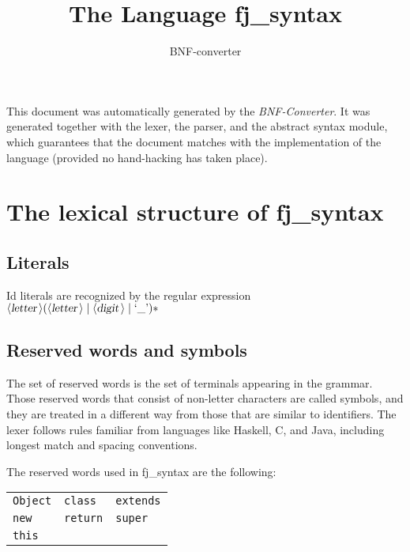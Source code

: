 \documentclass[a4paper,11pt]{article}
\author{BNF-converter}
\title{The Language fj_syntax}
\begin{document}
\maketitle

\newcommand{\emptyP}{\mbox{$\epsilon$}}
\newcommand{\terminal}[1]{\mbox{{\texttt {#1}}}}
\newcommand{\nonterminal}[1]{\mbox{$\langle \mbox{{\sl #1 }} \! \rangle$}}
\newcommand{\arrow}{\mbox{::=}}
\newcommand{\delimit}{\mbox{$|$}}
\newcommand{\reserved}[1]{\mbox{{\texttt {#1}}}}
\newcommand{\literal}[1]{\mbox{{\texttt {#1}}}}
\newcommand{\symb}[1]{\mbox{{\texttt {#1}}}}

This document was automatically generated by the {\em BNF-Converter}. It was generated together with the lexer, the parser, and the abstract syntax module, which guarantees that the document matches with the implementation of the language (provided no hand-hacking has taken place).

\section*{The lexical structure of fj_syntax}

\subsection*{Literals}


Id literals are recognized by the regular expression
\({\nonterminal{letter}} ({\nonterminal{letter}} \mid {\nonterminal{digit}} \mid \mbox{`\_'})*\)


\subsection*{Reserved words and symbols}
The set of reserved words is the set of terminals appearing in the grammar. Those reserved words that consist of non-letter characters are called symbols, and they are treated in a different way from those that are similar to identifiers. The lexer follows rules familiar from languages like Haskell, C, and Java, including longest match and spacing conventions.

The reserved words used in fj_syntax are the following: \\

\begin{tabular}{lll}
{\reserved{Object}} &{\reserved{class}} &{\reserved{extends}} \\
{\reserved{new}} &{\reserved{return}} &{\reserved{super}} \\
{\reserved{this}} & & \\
\end{tabular}\\
\end{document}

